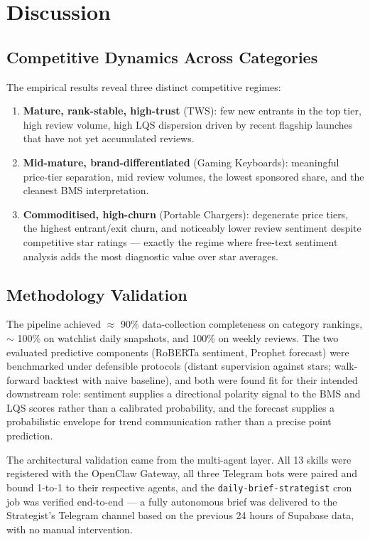 \section{Discussion}

\subsection{Competitive Dynamics Across Categories}

The empirical results reveal three distinct competitive regimes:

\begin{enumerate}
  \item \textbf{Mature, rank-stable, high-trust} (TWS): few new entrants in
  the top tier, high review volume, high LQS dispersion driven by recent
  flagship launches that have not yet accumulated reviews.
  \item \textbf{Mid-mature, brand-differentiated} (Gaming Keyboards):
  meaningful price-tier separation, mid review volumes, the lowest sponsored
  share, and the cleanest BMS interpretation.
  \item \textbf{Commoditised, high-churn} (Portable Chargers): degenerate
  price tiers, the highest entrant/exit churn, and noticeably lower review
  sentiment despite competitive star ratings --- exactly the regime where
  free-text sentiment analysis adds the most diagnostic value over star
  averages.
\end{enumerate}

\subsection{Methodology Validation}

The pipeline achieved $\approx$ 90\% data-collection completeness on
category rankings, $\sim$ 100\% on watchlist daily snapshots, and 100\% on
weekly reviews. The two evaluated predictive components (RoBERTa sentiment,
Prophet forecast) were benchmarked under defensible protocols (distant
supervision against stars; walk-forward backtest with naive baseline), and
both were found fit for their intended downstream role: sentiment supplies
a directional polarity signal to the BMS and LQS scores rather than a
calibrated probability, and the forecast supplies a probabilistic envelope
for trend communication rather than a precise point prediction.

The architectural validation came from the multi-agent layer. All
13 skills were registered with the OpenClaw Gateway, all three Telegram
bots were paired and bound 1-to-1 to their respective agents, and the
\texttt{daily-brief-strategist} cron job was verified end-to-end --- a
fully autonomous brief was delivered to the Strategist's Telegram channel
based on the previous 24 hours of Supabase data, with no manual
intervention.

